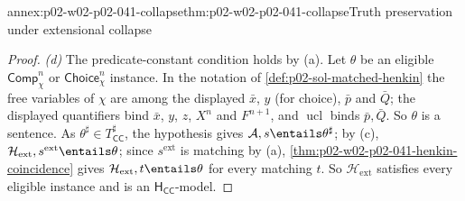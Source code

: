 \begin{annexitem}{annex:p02-w02-p02-041-collapse}{thm:p02-w02-p02-041-collapse}{Truth preservation under extensional collapse}
\begin{proof}
\emph{(d)}  The predicate-constant condition holds by (a).  Let \(\theta\) be
an eligible \(\mathsf{Comp}^n_\chi\) or \(\mathsf{Choice}^n_\chi\) instance.
In the notation of \cref{def:p02-sol-matched-henkin} the free variables of
\(\chi\) are among the displayed \(\bar x\), \(y\) (for choice), \(\bar p\)
and \(\bar Q\); the displayed quantifiers bind \(\bar x\), \(y\), \(z\),
\(X^n\) and \(F^{n+1}\), and \(\operatorname{ucl}\) binds \(\bar p,\bar Q\).
So \(\theta\) is a sentence.  As \(\theta^\sharp\in T_{\mathsf{CC}}^\sharp\),
the hypothesis gives \(\mathcal A,s\entails\theta^\sharp\); by (c),
\(\mathcal H_{\mathrm{ext}},s^{\mathrm{ext}}\entails\theta\); since
\(s^{\mathrm{ext}}\) is matching by (a),
\cref{thm:p02-w02-p02-041-henkin-coincidence} gives
\(\mathcal H_{\mathrm{ext}},t\entails\theta\) for every matching \(t\).  So
\(\mathcal H_{\mathrm{ext}}\) satisfies every eligible instance and is an
\(\mathsf H_{\mathsf{CC}}\)-model.
\end{proof}
\end{annexitem}

